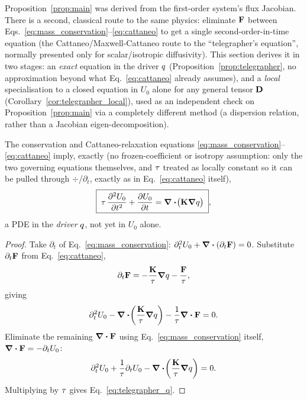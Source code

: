 Proposition~\ref{prop:main} was derived from the first-order system's
flux Jacobian. There is a second, classical route to the same physics:
eliminate $\mathbf{F}$ between Eqs.~\eqref{eq:mass_conservation}--\eqref{eq:cattaneo}
to get a single second-order-in-time equation (the Cattaneo/Maxwell-Cattaneo
route to the ``telegrapher's equation'', normally presented only for
scalar/isotropic diffusivity). This section derives it in two stages: an
\emph{exact} equation in the driver $q$ (Proposition~\ref{prop:telegrapher},
no approximation beyond what Eq.~\eqref{eq:cattaneo} already assumes), and
a \emph{local} specialisation to a closed equation in $U_0$ alone for any
general tensor $\mathbf{D}$ (Corollary~\ref{cor:telegrapher_local}), used as an
independent check on Proposition~\ref{prop:main} via a completely
different method (a dispersion relation, rather than a Jacobian
eigen-decomposition).

\begin{proposition}
\label{prop:telegrapher}
The conservation and Cattaneo-relaxation equations
\eqref{eq:mass_conservation}--\eqref{eq:cattaneo} imply, exactly (no
frozen-coefficient or isotropy assumption: only the two governing
equations themselves, and $\tau$ treated as locally constant so it
can be pulled through $\div$/$\partial_t$, exactly as in
Eq.~\eqref{eq:cattaneo} itself),
\begin{equation}
  \label{eq:telegrapher_q}
  \boxed{\;\tau\,\pdv[2]{U_0}{t} + \pdv{U_0}{t} = \div\!\big(\mathbf{K}\grad q\big)\;} ,
\end{equation}
a PDE in the \emph{driver} $q$, not yet in $U_0$ alone.
\end{proposition}

\begin{proof}
Take $\partial_t$ of Eq.~\eqref{eq:mass_conservation}:
$\partial_t^2 U_0 + \div(\partial_t\mathbf{F})=0$. Substitute
$\partial_t\mathbf{F}$ from Eq.~\eqref{eq:cattaneo},
\begin{equation}
  \partial_t\mathbf{F} = -\frac{\mathbf{K}}{\tau}\grad q - \frac{\mathbf{F}}{\tau} ,
\end{equation}
giving
\begin{equation}
  \partial_t^2U_0 - \div\!\left(\frac{\mathbf{K}}{\tau}\grad q\right) - \frac{1}{\tau}\div\mathbf{F} = 0 .
\end{equation}
Eliminate the remaining $\div\mathbf{F}$ using
Eq.~\eqref{eq:mass_conservation} itself, $\div\mathbf{F}=-\partial_tU_0$:
\begin{equation}
  \partial_t^2U_0 + \frac{1}{\tau}\partial_tU_0 - \div\!\left(\frac{\mathbf{K}}{\tau}\grad q\right) = 0 .
\end{equation}
Multiplying by $\tau$ gives Eq.~\eqref{eq:telegrapher_q}.
\end{proof}

